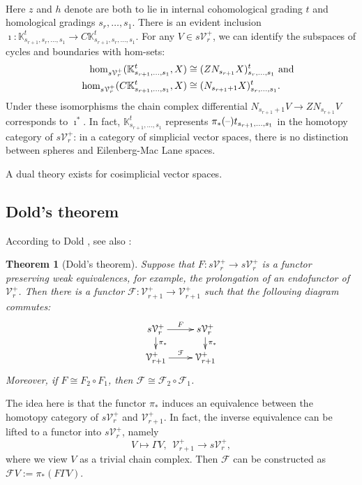 \documentclass[11pt]{amsart}
\theoremstyle{plain}
\newtheorem{thm}{Theorem}[section]
\theoremstyle{definition}
\newcommand{\DASH}{\textup{--}}
\renewcommand{\to}{\longrightarrow}
\newcommand{\calF}{\mathcal{F}}
\newcommand{\calV}{\mathcal{V}}
\theoremstyle{plain}
\newcommand{\vect}[2]{\calV^{#1}_{#2}}
\begin{document}
\begin{Conventions and notation}
\begin{gather*}
{}
\end{gather*}
Here $z$ and $h$ denote are both to lie in internal cohomological grading $t$ and homological gradings $s_r,\ldots,s_1$.
There is an evident inclusion $\imath:\mathbb{K}_{s_{r+1},s_r,\ldots,s_1}^t\to C\mathbb{K}_{s_{r+1},s_r,\ldots,s_1}^t$. For any $V\in s\vect{+}{r}$, we can identify the subspaces of cycles and boundaries with hom-sets:
\begin{alignat*}{2}
\hom_{s\vect{+}{r}}(\mathbb{K}^t_{s_{r+1},\ldots,s_1},X)&\cong (ZN_{s_{r+1}}X)_{s_r,\ldots,s_1}^t\makebox[0cm][l]{ and}\\
\hom_{s\vect{+}{r}}(C\mathbb{K}^t_{s_{r+1},\ldots,s_1},X)&\cong (N_{s_{r+1}+1}X)_{s_r,\ldots,s_1}^t.
\end{alignat*}
Under these isomorphisms the chain complex differential $N_{s_{r+1}+1}V\to ZN_{s_{r+1}}V$ corresponds to $\imath^*$. In fact, $\mathbb{K}^t_{s_{r+1},\ldots,s_1}$ represents $\pi_*(\DASH)t_{s_{r+1},\ldots,s_1}$ in the homotopy category of $s\vect{+}{r}$: in a category of simplicial vector spaces, there is no distinction between spheres and Eilenberg-Mac Lane spaces.

A dual theory exists for cosimplicial vector spaces.
\subsection{Dold's theorem}
According to Dold \cite{DoldHomologySPs.pdf}, see also \cite[Lemma 3.1]{ChingUnpublished}: 
\begin{thm}[Dold's theorem]\label{Dold's theorem}
Suppose that $F:s\vect{+}{r}\to s\vect{+}{r}$ is a functor preserving weak equivalences, for example, the prolongation of an endofunctor of $\vect{+}{r}$. Then there is a functor $\calF:\vect{+}{r+1}\to\vect{+}{r+1}$ such that the following diagram commutes:
\[\xymatrix@R=4mm{
s\vect{+}{r}\ar[r]^-{F}
\ar[d]^-{\pi_*}
&%
s\vect{+}{r}\ar[d]^-{\pi_*}
\\%
\vect{+}{r+1}\ar[r]^-{\calF}
&
\vect{+}{r+1}
}\]
Moreover, if $F\cong F_2\circ F_1$, then $\calF\cong \calF_2\circ \calF_1$.
\end{thm}
\noindent The idea here is that the functor $\pi_*$ induces an equivalence between the homotopy category of $s\vect{+}{r}$ and $\vect{+}{r+1}$. In fact, the inverse equivalence can be lifted to a functor into $s\vect{+}{r}$, namely 
\[V\mapsto \Gamma V,\ \ \vect{+}{r+1}\to s\vect{+}{r},\]
where we view $V$ as a trivial chain complex. Then $\calF$ can be constructed as $\calF V:=\pi_*(F\Gamma V)$.


\end{Conventions and notation}
\end{document}
